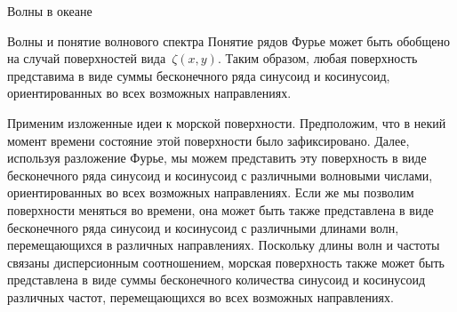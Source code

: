 \begin{chapter}{Волны в океане}
\begin{section}{Волны и понятие волнового спектра}
Понятие рядов Фурье может быть обобщено на случай поверхностей 
вида~$\zeta (x,y)$.
Таким образом, любая поверхность представима в виде суммы
бесконечного ряда синусоид и косинусоид, ориентированных во всех возможных
направлениях.
%

Применим изложенные идеи к морской поверхности. Предположим, что в некий
момент времени состояние этой поверхности было зафиксировано. Далее,
используя разложение Фурье, мы можем представить эту поверхность в виде
бесконечного ряда синусоид и косинусоид с различными волновыми числами,
ориентированных во всех возможных направлениях. Если же мы позволим
поверхности меняться во времени, она может быть также представлена в виде
бесконечного ряда синусоид и косинусоид с различными длинами волн, 
перемещающихся в различных направлениях. Поскольку длины волн и частоты
связаны дисперсионным соотношением, морская поверхность также может быть
представлена в виде суммы бесконечного количества синусоид и косинусоид
различных частот, перемещающихся во всех возможных направлениях.
%


\end{section}
\end{chapter}
